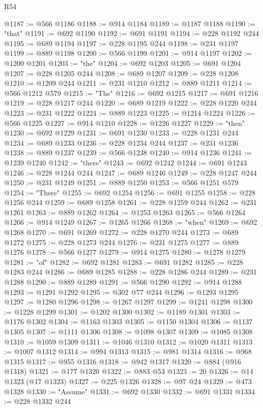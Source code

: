 \begin{lexlean}{R54}
\begin{coremodule}
@1187 := @566 @1186
@1188 := @914 @1184
@1189 := @1187 @1188
@1190 := "that"
@1191 := @692 @1190
@1192 := @691 @1191
@1194 := @228 @1192 @244
@1195 := @689 @1194
@1197 := @228 @1195 @244
@1198 := @231 @1197
@1199 := @889 @1198
@1200 := @566 @1199
@1201 := @914 @1197
@1202 := @1200 @1201
@1203 := "the"
@1204 := @692 @1203
@1205 := @691 @1204
@1207 := @228 @1205 @244
@1208 := @689 @1207
@1209 := @228 @1208
@1210 := @1209 @244
@1211 := @231 @1210
@1212 := @889 @1211
@1214 := @566 @1212 @579
@1215 := "The"
@1216 := @692 @1215
@1217 := @691 @1216
@1219 := @228 @1217 @244
@1220 := @689 @1219
@1222 := @228 @1220 @244
@1223 := @231 @1222
@1224 := @889 @1223
@1225 := @1214 @1224
@1226 := @566 @1225
@1227 := @914 @1210
@1228 := @1226 @1227
@1229 := "then"
@1230 := @692 @1229
@1231 := @691 @1230
@1233 := @228 @1231 @244
@1234 := @689 @1233
@1236 := @228 @1234 @244
@1237 := @231 @1236
@1238 := @889 @1237
@1239 := @566 @1238
@1240 := @914 @1236
@1241 := @1239 @1240
@1242 := "there"
@1243 := @692 @1242
@1244 := @691 @1243
@1246 := @228 @1244 @244
@1247 := @689 @1246
@1249 := @228 @1247 @244
@1250 := @231 @1249
@1251 := @889 @1250
@1253 := @566 @1251 @579
@1254 := "There"
@1255 := @692 @1254
@1256 := @691 @1255
@1258 := @228 @1256 @244
@1259 := @689 @1258
@1261 := @228 @1259 @244
@1262 := @231 @1261
@1263 := @889 @1262
@1264 := @1253 @1263
@1265 := @566 @1264
@1266 := @914 @1249
@1267 := @1265 @1266
@1268 := "when"
@1269 := @692 @1268
@1270 := @691 @1269
@1272 := @228 @1270 @244
@1273 := @689 @1272
@1275 := @228 @1273 @244
@1276 := @231 @1275
@1277 := @889 @1276
@1278 := @566 @1277
@1279 := @914 @1275
@1280 := @1278 @1279
@1281 := "of"
@1282 := @692 @1281
@1283 := @691 @1282
@1285 := @228 @1283 @244
@1286 := @689 @1285
@1288 := @228 @1286 @244
@1289 := @231 @1288
@1290 := @889 @1289
@1291 := @566 @1290
@1292 := @914 @1288
@1293 := @1291 @1292
@1295 := @302 @77 @244
@1296 := @1293 @1295
@1297 := @1280 @1296
@1298 := @1267 @1297
@1299 := @1241 @1298
@1300 := @1228 @1299
@1301 := @1202 @1300
@1302 := @1189 @1301
@1303 := @1176 @1302
@1304 := @1163 @1303
@1305 := @1150 @1304
@1306 := @1137 @1305
@1307 := @1111 @1306
@1308 := @1098 @1307
@1309 := @1085 @1308
@1310 := @1059 @1309
@1311 := @1046 @1310
@1312 := @1020 @1311
@1313 := @1007 @1312
@1314 := @994 @1313
@1315 := @981 @1314
@1316 := @968 @1315
@1317 := @955 @1316
@1318 := @942 @1317
@1320 := @884 (@916 @1318)
@1321 := @177 @1320
@1322 := @883 @53
@1323 := 20
@1326 := @14 @1323 (@17 @1323)
@1327 := @225 @1326
@1328 := @97 @24
@1329 := @473 @1328
@1330 := "Assume"
@1331 := @692 @1330
@1332 := @691 @1331
@1334 := @228 @1332 @244

\end{coremodule}
\end{lexlean}
